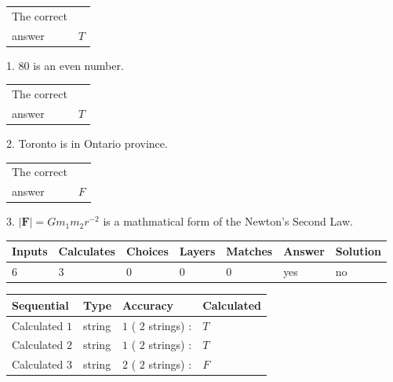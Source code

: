 \documentclass[12pt]{article}
\begin{document}
 
 
\noindent{}
 
 

 
\noindent\begin{tabular}{|l|l|}\hline The correct & \\
          answer &  %
$T$ \\ \hline \end{tabular}
1. $ %
80$ is an  %
even number.
 
\noindent\begin{tabular}{|l|l|}\hline The correct & \\
          answer &  %
$T$ \\ \hline \end{tabular}
2.  %
Toronto is in  %
Ontario province.
 
\noindent\begin{tabular}{|l|l|}\hline The correct & \\
          answer &  %
$F$ \\ \hline \end{tabular}
3.  %
$\left| \mathbf{F}\right| =Gm_1m_2r^{-2}$ is a mathmatical form of  %
the Newton's Second Law.
 
 
 
\noindent{}
 
 

 
\vspace{0.3in}
   
   
   
   
\noindent\begin{tabular}{|l|l|l|l|l|l|l|}
 \hline
Inputs & Calculates & Choices & Layers & Matches & Answer & Solution \\ \hline
           6 & 
           3 & 
           0
  & 
           0 & 
           0 & 
  yes & 
  no 
  \\ \hline
 \end{tabular}
   
   
   
   
\noindent{}
   
   
  
  
\noindent\begin{tabular}{|l|l|l|l|}
\hline
 Sequential & Type & Accuracy & Calculated \\ 
\hline
 
 
  Calculated $           1$ & string & $           1 $ ( $          2 $ strings)
 : 
 & $T$
 \\  \hline  
 
 
  Calculated $           2$ & string & $           1 $ ( $          2 $ strings)
 : 
 & $T$
 \\  \hline  
 
 
  Calculated $           3$ & string & $           2 $ ( $          2 $ strings)
 : 
 & $F$
 \\  \hline  
 \end{tabular}
   
\end{document}
